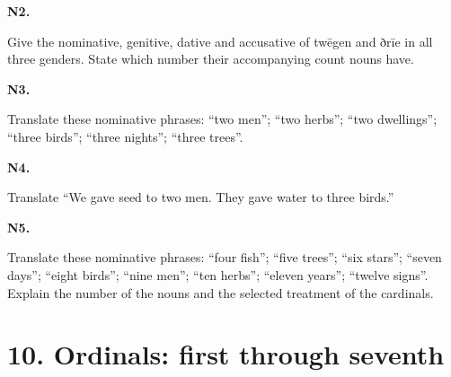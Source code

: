 \par\begin{minipage}{\linewidth}\raggedright
\textbf{N2.}

Give the nominative, genitive, dative and accusative of twēgen and ðrīe in all three genders. State which number their accompanying count nouns have.

\end{minipage}\par\addvspace{4pt}

\par\begin{minipage}{\linewidth}\raggedright
\textbf{N3.}

Translate these nominative phrases: “two men”; “two herbs”; “two dwellings”; “three birds”; “three nights”; “three trees”.

\end{minipage}\par\addvspace{4pt}

\par\begin{minipage}{\linewidth}\raggedright
\textbf{N4.}

Translate “We gave seed to two men. They gave water to three birds.”

\end{minipage}\par\addvspace{4pt}

\par\begin{minipage}{\linewidth}\raggedright
\textbf{N5.}

Translate these nominative phrases: “four fish”; “five trees”; “six stars”; “seven days”; “eight birds”; “nine men”; “ten herbs”; “eleven years”; “twelve signs”. Explain the number of the nouns and the selected treatment of the cardinals.

\end{minipage}\par\addvspace{4pt}

\section*{10. Ordinals: first through seventh}

